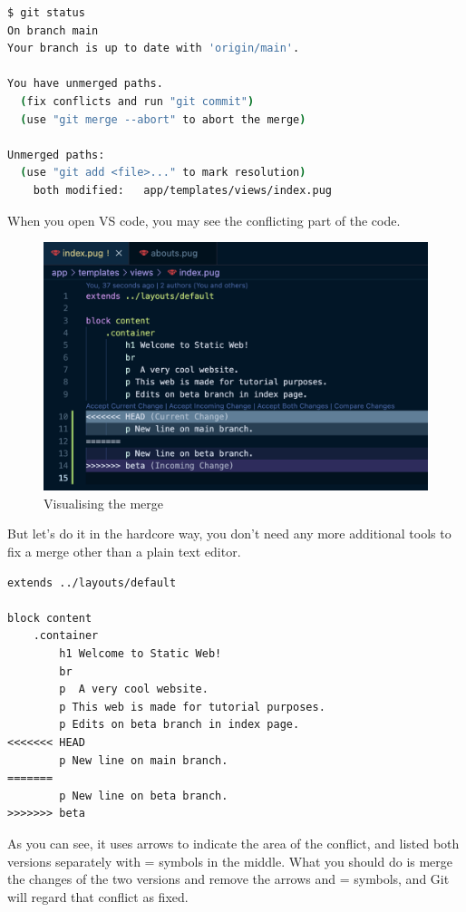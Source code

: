 \begin{lstlisting}[language=bash]
$ git status
On branch main
Your branch is up to date with 'origin/main'.

You have unmerged paths.
  (fix conflicts and run "git commit")
  (use "git merge --abort" to abort the merge)

Unmerged paths:
  (use "git add <file>..." to mark resolution)
	both modified:   app/templates/views/index.pug
\end{lstlisting}
\vspace{6mm}

When you open VS code, you may see the conflicting part of the code.
\vspace{6mm}

\begin{figure}[h]
\centering
\includegraphics[width=12cm]{images/ch8-merge-conflict-vscode.png}
\caption{Visualising the merge}
\end{figure}

But let's do it in the hardcore way, you don't need any more additional tools to fix a merge other than a plain text editor. 

\begin{lstlisting}[language=pug]
extends ../layouts/default

block content
	.container
		h1 Welcome to Static Web!
		br
		p  A very cool website.
		p This web is made for tutorial purposes.
		p Edits on beta branch in index page.
<<<<<<< HEAD
		p New line on main branch.
=======
		p New line on beta branch.
>>>>>>> beta
\end{lstlisting}
\vspace{6mm}

As you can see, it uses arrows to indicate the area of the conflict, and listed both versions separately with = symbols in the middle. What you should do is merge the changes of the two versions and remove the arrows and = symbols, and Git will regard that conflict as fixed. 

